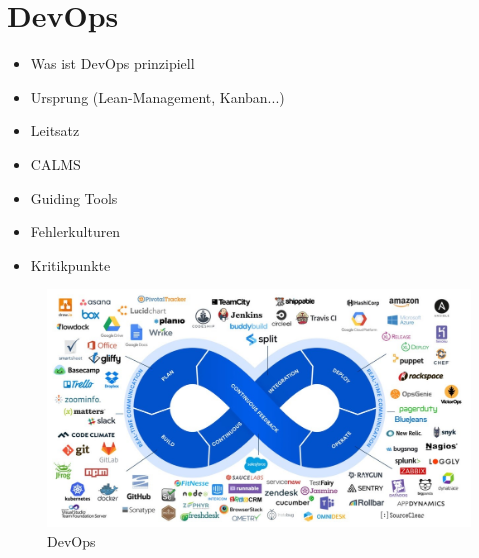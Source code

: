 \chapter{\ac{DevOps}}

\begin{itemize}
\item Was ist DevOps prinzipiell
\item Ursprung (Lean-Management, Kanban...)
\item Leitsatz
\item CALMS
\item Guiding Tools
\item Fehlerkulturen
\item Kritikpunkte
\end{itemize}

\begin{figure}[h]
\centering
\includegraphics[width=\textwidth]{Graphics/devops}
\caption{DevOps \cite{uplink:2021}}
\end{figure}
